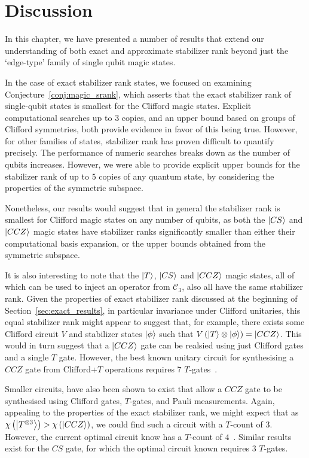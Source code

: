 \section{Discussion}\label{sec:srank_discussion}
In this chapter, we have presented a number of results that extend our understanding of both exact and approximate stabilizer rank beyond just the `edge-type' family of single qubit magic states.\par
In the case of exact stabilizer rank states, we focused on examining Conjecture~\ref{conj:magic_srank}, which asserts that the exact stabilizer rank of single-qubit states is smallest for the Clifford magic states. Explicit computational searches up to $3$ copies, and an upper bound based on groups of Clifford symmetries, both provide evidence in favor of this being true.
However, for other families of states, stabilizer rank has proven difficult to quantify precisely. The performance of numeric searches breaks down as the number of qubits increases. However, we were able to provide explicit upper bounds for the stabilizer rank of up to $5$ copies of any quantum state, by considering the properties of the symmetric subspace.\par
Nonetheless, our results would suggest that in general the stabilizer rank is smallest for Clifford magic states on any number of qubits, as both the $\ket{CS}$ and $\ket{CCZ}$ magic states have stabilizer ranks significantly smaller than either their computational basis expansion, or the upper bounds obtained from the symmetric subspace.\par
It is also interesting to note that the $\ket{T}$, $\ket{CS}$ and $\ket{CCZ}$ magic states, all of which can be used to inject an operator from $\mathcal{C}_{3}$, also all have the same stabilizer rank. Given the properties of exact stabilizer rank discussed at the beginning of Section~\ref{sec:exact_results}, in particular invariance under Clifford unitaries, this equal stabilizer rank might appear to suggest that, for example, there exists some Clifford circuit $V$ and stabilizer states $\ket{\phi}$ such that $V\left(\ket{T}\otimes\ket{\phi}\right)=\ket{CCZ}$. This would in turn suggest that a $\ket{CCZ}$ gate can be realsied using just Clifford gates and a single $T$ gate. However, the best known unitary circuit for synthesising a $CCZ$ gate from Clifford+$T$ operations requires $7$ $T$-gates~\cite{Nielsen2000}.\par
Smaller circuits, have also been shown to exist that allow a $CCZ$ gate to be synthesised using Clifford gates, $T$-gates, and Pauli measurements. Again, appealing to the properties of the exact stabilizer rank, we might expect that as $\chi\left(\ket{T^{\otimes 3}}\right)>\chi\left(\ket{CCZ}\right)$, we could find such a circuit with a $T$-count of $3$. However, the current optimal circuit know has a $T$-count of $4$~\cite{Jones2013}. Similar results exist for the $CS$ gate, for which the optimal circuit known requires $3$ $T$-gates.\par
